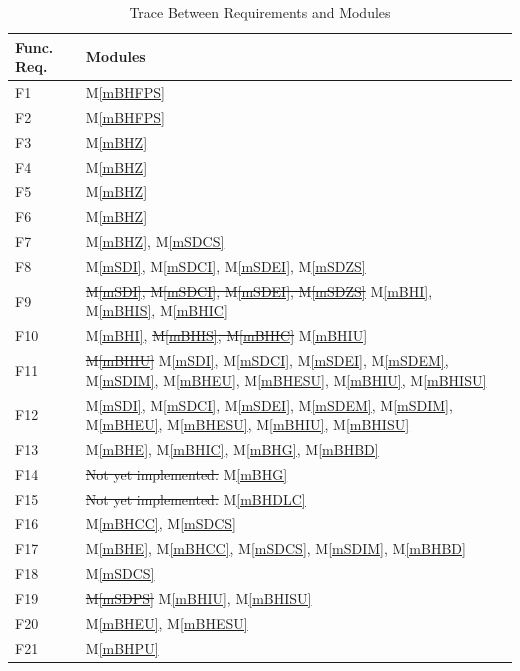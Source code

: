 \documentclass[12pt, titlepage]{article}
\newcommand{\mref}[1]{M\ref{#1}}
\begin{document}
\begin{table}[H]
\centering
\begin{tabular}{p{} p{}}
\toprule
\textbf{{\color {magenta} Func.} Req.} & \textbf{Modules}\\
\midrule
F1 & \mref{mBHFPS}\\
F2 & \mref{mBHFPS} \\
F3 & \mref{mBHZ} \\
F4 & \mref{mBHZ}\\
F5 & \mref{mBHZ}\\
F6 & \mref{mBHZ} \\
F7 & \mref{mBHZ}, \mref{mSDCS} \\
F8 & \mref{mSDI}, \mref{mSDCI}, \mref{mSDEI}, \mref{mSDZS} \\
F9 &  \sout{\mref{mSDI}, \mref{mSDCI}, \mref{mSDEI}, \mref{mSDZS}}  {\color {magenta}\mref{mBHI}, \mref{mBHIS},  \mref{mBHIC}}\\
F10 & \mref{mBHI}, \sout{\mref{mBHIS},  \mref{mBHIC}}  {\color {magenta}\mref{mBHIU}}\\
F11 & \sout{\mref{mBHIU}} {\color {magenta} \mref{mSDI}, \mref{mSDCI}, \mref{mSDEI}, \mref{mSDEM}, \mref{mSDIM}, \mref{mBHEU}, \mref{mBHESU}, \mref{mBHIU}, \mref{mBHISU}} \\
F12 & \mref{mSDI}, \mref{mSDCI}, \mref{mSDEI}, \mref{mSDEM}, \mref{mSDIM}, \mref{mBHEU}, \mref{mBHESU}, \mref{mBHIU}, \mref{mBHISU}\\
F13 & \mref{mBHE}, \mref{mBHIC}, \mref{mBHG}, {\color {magenta} \mref{mBHBD}}\\ 
F14 & \sout{ Not yet implemented.} \mref{mBHG}\\
F15 &  \sout{Not yet implemented.} \mref{mBHDLC}\\
F16 &  \mref{mBHCC}, \mref{mSDCS}\\
F17 &  \mref{mBHE}, \mref{mBHCC},  \mref{mSDCS},  \mref{mSDIM}, \mref{mBHBD}\\ 
F18 &  \mref{mSDCS}\\
F19 &  \sout{\mref{mSDPS}} {\color {magenta}\mref{mBHIU}, \mref{mBHISU}}\\
{\color {magenta}F20} &  {\color {magenta}\mref{mBHEU}, \mref{mBHESU}}\\
{\color {magenta}F21} &  {\color {magenta}\mref{mBHPU}}\\
\bottomrule
\end{tabular}
\caption{Trace Between Requirements and Modules}
\label{TblRT}
\end{table}
\end{document}
